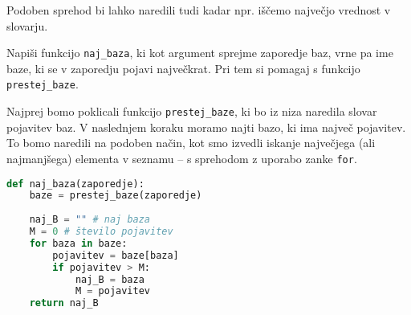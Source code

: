 Podoben sprehod bi lahko naredili tudi kadar npr. iščemo največjo vrednost v slovarju. 
\begin{zgled}
Napiši funkcijo \texttt{naj\_baza}, ki kot argument sprejme zaporedje baz, vrne pa ime baze, ki se v zaporedju pojavi največkrat. Pri tem si pomagaj s funkcijo \texttt{prestej\_baze}. 
\end{zgled}
\begin{resitev}
Najprej bomo poklicali funkcijo \texttt{prestej\_baze}, ki bo iz niza naredila slovar pojavitev baz. V naslednjem koraku moramo najti bazo, ki ima največ pojavitev. To bomo naredili na podoben način, kot smo izvedli iskanje največjega (ali najmanjšega) elementa v seznamu -- s sprehodom z uporabo zanke \texttt{for}.

\begin{lstlisting}[language=Python]
def naj_baza(zaporedje):
    baze = prestej_baze(zaporedje)
    
    naj_B = "" # naj baza
    M = 0 # število pojavitev
    for baza in baze:
        pojavitev = baze[baza]
        if pojavitev > M:
            naj_B = baza
            M = pojavitev
    return naj_B 
\end{lstlisting}
\end{resitev}


